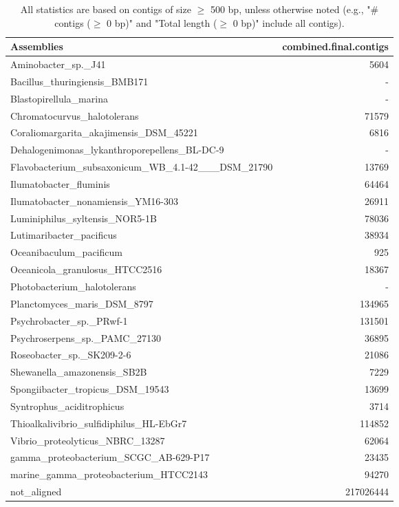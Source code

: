 \documentclass[12pt,a4paper]{article}
\begin{document}
\begin{table}[ht]
\begin{center}
\caption{All statistics are based on contigs of size $\geq$ 500 bp, unless otherwise noted (e.g., "\# contigs ($\geq$ 0 bp)" and "Total length ($\geq$ 0 bp)" include all contigs).}
\begin{tabular}{|l*{1}{|r}|}
\hline
Assemblies & combined.final.contigs \\ \hline
Aminobacter\_sp.\_J41 & 5604 \\ \hline
Bacillus\_thuringiensis\_BMB171 & - \\ \hline
Blastopirellula\_marina & - \\ \hline
Chromatocurvus\_halotolerans & 71579 \\ \hline
Coraliomargarita\_akajimensis\_DSM\_45221 & 6816 \\ \hline
Dehalogenimonas\_lykanthroporepellens\_BL-DC-9 & - \\ \hline
Flavobacterium\_subsaxonicum\_WB\_4.1-42\_\_\_DSM\_21790 & 13769 \\ \hline
Ilumatobacter\_fluminis & 64464 \\ \hline
Ilumatobacter\_nonamiensis\_YM16-303 & 26911 \\ \hline
Luminiphilus\_syltensis\_NOR5-1B & 78036 \\ \hline
Lutimaribacter\_pacificus & 38934 \\ \hline
Oceanibaculum\_pacificum & 925 \\ \hline
Oceanicola\_granulosus\_HTCC2516 & 18367 \\ \hline
Photobacterium\_halotolerans & - \\ \hline
Planctomyces\_maris\_DSM\_8797 & 134965 \\ \hline
Psychrobacter\_sp.\_PRwf-1 & 131501 \\ \hline
Psychroserpens\_sp.\_PAMC\_27130 & 36895 \\ \hline
Roseobacter\_sp.\_SK209-2-6 & 21086 \\ \hline
Shewanella\_amazonensis\_SB2B & 7229 \\ \hline
Spongiibacter\_tropicus\_DSM\_19543 & 13699 \\ \hline
Syntrophus\_aciditrophicus & 3714 \\ \hline
Thioalkalivibrio\_sulfidiphilus\_HL-EbGr7 & 114852 \\ \hline
Vibrio\_proteolyticus\_NBRC\_13287 & 62064 \\ \hline
gamma\_proteobacterium\_SCGC\_AB-629-P17 & 23435 \\ \hline
marine\_gamma\_proteobacterium\_HTCC2143 & 94270 \\ \hline
not\_aligned & 217026444 \\ \hline
\end{tabular}
\end{center}
\end{table}
\end{document}
